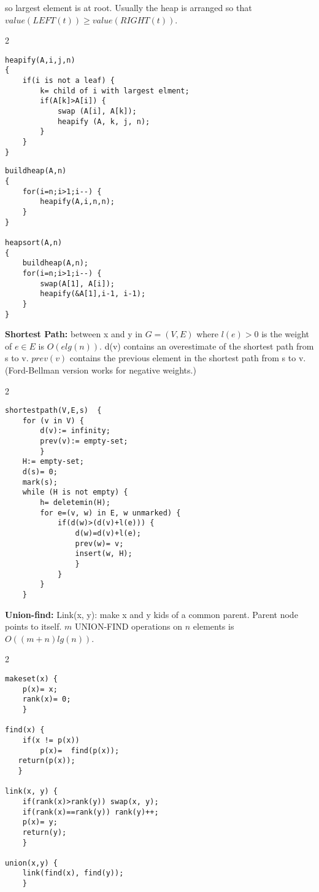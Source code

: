 so largest element is at root.  Usually the
heap is arranged so that $value(LEFT(t)) \geq value(RIGHT(t))$.
\begin{multicols} {2} {
\begin{verbatim}
heapify(A,i,j,n) 
{
    if(i is not a leaf) {
        k= child of i with largest elment;
        if(A[k]>A[i]) {
            swap (A[i], A[k]);
            heapify (A, k, j, n);
        }
    }
}
\end{verbatim}

\begin{verbatim}
buildheap(A,n) 
{
    for(i=n;i>1;i--) {
        heapify(A,i,n,n);
    }
}

heapsort(A,n) 
{
    buildheap(A,n);
    for(i=n;i>1;i--) {
        swap(A[1], A[i]); 
        heapify(&A[1],i-1, i-1);
    }
}
\end{verbatim}
}
\end{multicols}

{\bf Shortest Path:} between x and y in $G=(V, E)$ where
$l(e)>0$ is the weight of $e \in E$ is $O(e lg(n))$. d(v) contains an overestimate
of the shortest path from s to v.
$prev(v)$ contains the previous element in the
shortest path from s to v.  (Ford-Bellman version works for negative weights.)
\begin{multicols} {2} {
\begin{verbatim}
shortestpath(V,E,s)  {
    for (v in V) {
        d(v):= infinity;
        prev(v):= empty-set;
        }
    H:= empty-set; 
    d(s)= 0; 
    mark(s);
    while (H is not empty) {
        h= deletemin(H);
        for e=(v, w) in E, w unmarked) {
            if(d(w)>(d(v)+l(e))) {
                d(w)=d(v)+l(e);
                prev(w)= v;
                insert(w, H);
                }
            }
        }
    }
\end{verbatim}
}
\end{multicols}

{\bf Union-find:}  Link(x, y): make x and y kids of a common parent.  Parent node
points to itself.  $m$ UNION-FIND operations on $n$ elements is $O((m+n) lg(n))$.

\begin{multicols} {2} {
\begin{verbatim}
makeset(x) {
    p(x)= x;
    rank(x)= 0;
    } 

find(x) {
    if(x != p(x))
        p(x)=  find(p(x)); 
   return(p(x));
   }

link(x, y) {
    if(rank(x)>rank(y)) swap(x, y);
    if(rank(x)==rank(y)) rank(y)++;
    p(x)= y;
    return(y);
    }

union(x,y) {
    link(find(x), find(y));
    }
\end{verbatim}
}
\end{multicols}

